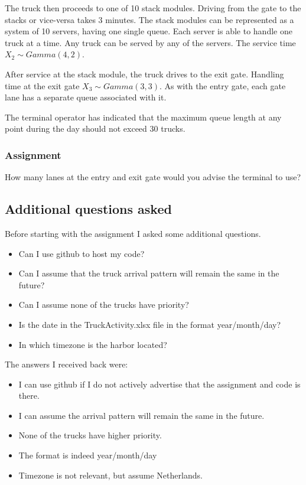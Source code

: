 \documentclass{article}
\begin{document}
The truck then proceeds to one of 10 stack modules. Driving from the
gate to the stacks or vice-versa takes 3 minutes. The stack modules
can be represented as a system of 10 servers, having one single
queue. Each server is able to handle one truck at a time. Any truck
can be served by any of the servers. The service time $X_2 \sim
Gamma(4, 2)$.

After service at the stack module, the truck drives to the exit
gate. Handling time at the exit gate $X_3 \sim Gamma(3, 3)$. As with
the entry gate, each gate lane has a separate queue associated with
it.

The terminal operator has indicated that the maximum queue length at
any point during the day should not exceed 30 trucks.

\subsubsection{Assignment}

How many lanes at the entry and exit gate would you advise the
terminal to use?

\subsection{Additional questions asked}

Before starting with the assignment I asked some additional questions.

\begin{itemize}
\item Can I use github to host my code?
\item Can I assume that the truck arrival pattern will remain the same
  in the future?
\item Can I assume none of the trucks have priority?
\item Is the date in the TruckActivity.xlsx file in the format
  year/month/day?
\item In which timezone is the harbor located?
\end{itemize}

The answers I received back were:

\begin{itemize}
\item I can use github if I do not actively advertise that the
  assignment and code is there.
\item I can assume the arrival pattern will remain the same in the
  future.
\item None of the trucks have higher priority.
\item The format is indeed year/month/day
\item Timezone is not relevant, but assume Netherlands.
\end{itemize}
\end{document}
